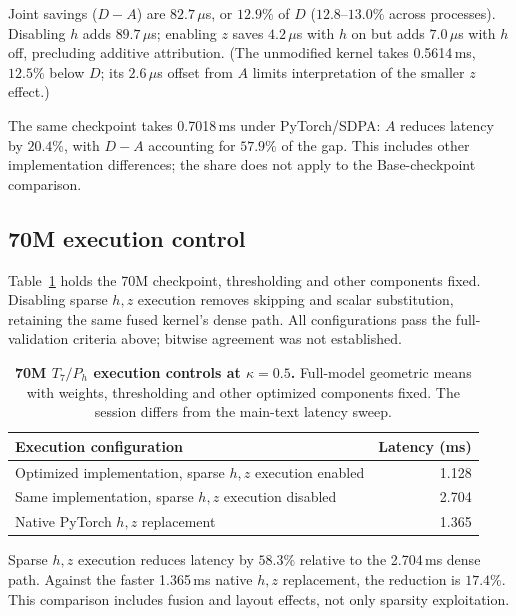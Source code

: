 Joint savings ($D-A$) are $82.7\,\mu$s, or $12.9\%$ of $D$ ($12.8$--$13.0\%$ across processes). Disabling $h$ adds $89.7\,\mu$s; enabling $z$ saves $4.2\,\mu$s with $h$ on but adds $7.0\,\mu$s with $h$ off, precluding additive attribution. (The unmodified kernel takes 0.5614\,ms, $12.5\%$ below $D$; its $2.6\,\mu$s offset from $A$ limits interpretation of the smaller $z$ effect.)

The same checkpoint takes 0.7018\,ms under PyTorch/SDPA: $A$ reduces latency by $20.4\%$, with $D-A$ accounting for $57.9\%$ of the gap. This includes other implementation differences; the share does not apply to the Base-checkpoint comparison.

\subsection{70M execution control}
\label{app:kernel-transfer}
Table~\ref{tab:70m-hz-control} holds the 70M checkpoint, thresholding and other components fixed. Disabling sparse $h,z$ execution removes skipping and scalar substitution, retaining the same fused kernel's dense path. All configurations pass the full-validation criteria above; bitwise agreement was not established.

\begin{table}[H]
\centering\small
\caption{\textbf{70M $T_7/P_h$ execution controls at $\kappa=0.5$.}
Full-model geometric means with weights, thresholding and other optimized
components fixed. The session differs from the main-text latency sweep.}
\label{tab:70m-hz-control}
\begin{tabularx}{\linewidth}{@{}>{\raggedright\arraybackslash}Xr@{}}
\toprule
Execution configuration & Latency (ms) \\
\midrule
Optimized implementation, sparse $h,z$ execution enabled & 1.128 \\
Same implementation, sparse $h,z$ execution disabled & 2.704 \\
Native PyTorch $h,z$ replacement & 1.365 \\
\bottomrule
\end{tabularx}
\end{table}

Sparse $h,z$ execution reduces latency by $58.3\%$ relative to the 2.704\,ms dense path. Against the faster 1.365\,ms native $h,z$ replacement, the reduction is $17.4\%$. This comparison includes fusion and layout effects, not only sparsity exploitation.
